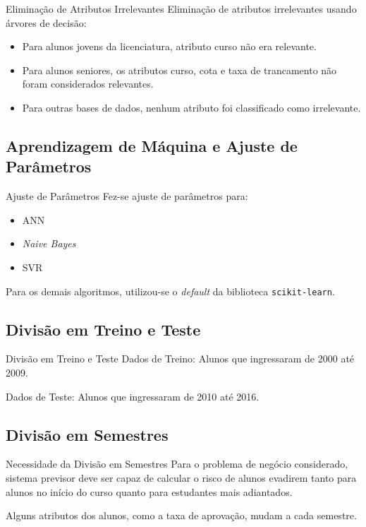 \begin{frame}{Eliminação de Atributos Irrelevantes}
    Eliminação de atributos irrelevantes usando árvores de decisão: 
    \begin{itemize}
        \item Para alunos jovens da licenciatura, atributo curso não era relevante. 
        \item Para alunos seniores, os atributos curso, cota e taxa de trancamento
            não foram considerados relevantes. 
        \item Para outras bases de dados, nenhum atributo foi classificado como
            irrelevante. 
    \end{itemize}
\end{frame}

\subsection{Aprendizagem de Máquina e Ajuste de Parâmetros}
\begin{frame}{Ajuste de Parâmetros}
    Fez-se ajuste de parâmetros para:
    \begin{itemize}
        \item ANN
        \item \textit{Naive Bayes}
        \item SVR
    \end{itemize}

    \vspace{0.5cm}

    Para os demais algoritmos, utilizou-se o \textit{default} da biblioteca
    \texttt{scikit-learn}.
\end{frame}

\subsection{Divisão em Treino e Teste}
\begin{frame}{Divisão em Treino e Teste}
    Dados de Treino: Alunos que ingressaram de 2000 até 2009.

    \vspace{0.5cm}

    Dados de Teste: Alunos que ingressaram de 2010 até 2016.
\end{frame}

\subsection{Divisão em Semestres}
\begin{frame}{Necessidade da Divisão em Semestres}
    Para o problema de negócio considerado, sistema previsor deve ser capaz de
    calcular o risco de alunos evadirem tanto para alunos no início do curso quanto
    para estudantes mais adiantados. 

    \vspace{0.5cm}

    Alguns atributos dos alunos, como a taxa de aprovação, mudam a cada semestre.
\end{frame}

